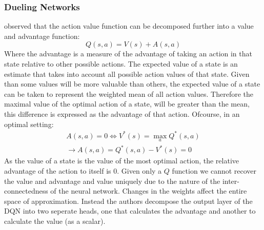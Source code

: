 \subsubsection{Dueling Networks}
\cite{Ziyu2015} observed that the action value function can be decomposed
further into a value and advantage function:
\begin{equation}
    Q(s,a) = V(s) + A(s,a)
\end{equation}
Where the advantage is a measure of the advantage of taking an action in that state relative
to other possible actions. The expected value of a state is an estimate that takes into account
all possible action values of that state. Given than some values will be more valuable than others,
the expected value of a state can be taken to represent the weighted mean of all action values. Therefore
the maximal value of the optimal action of a state, will be greater than the mean, this difference is 
expressed as the advantage of that action. Ofcourse, in an optimal setting:
\begin{equation}
    \begin{gathered}
        A(s,a) = 0 \Longleftrightarrow V^*(s) = \max_a Q^*(s,a)\\
        \rightarrow A(s,a) = Q^*(s,a) - V^*(s) = 0
    \end{gathered}
\end{equation}
As the value of a state is the value of the most optimal action, the relative advantage of
the action to itself is $0$. Given only a $Q$ function we cannot recover the value
and advantage and value uniquely due to the nature of the inter-connectedness of the neural
network. Changes in the weights affect the entire space of approximation. Instead
the authors decompose the output layer of the DQN into two seperate heads, one that calculates
the advantage and another to calculate the value (as a scalar).

